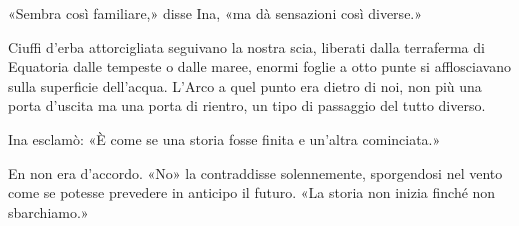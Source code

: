 «Sembra così familiare,» disse Ina, «ma dà sensazioni così diverse.»

Ciuffi d'erba attorcigliata seguivano la nostra scia, liberati dalla
terraferma di Equatoria dalle tempeste o dalle maree, enormi foglie a
otto punte si afflosciavano sulla superficie dell'acqua. L'Arco a quel
punto era dietro di noi, non più una porta d'uscita ma una porta di
rientro, un tipo di passaggio del tutto diverso.

Ina esclamò: «È come se una storia fosse finita e un'altra cominciata.»

En non era d'accordo. «No» la contraddisse solennemente, sporgendosi nel
vento come se potesse prevedere in anticipo il futuro. «La storia non
inizia finché non sbarchiamo.»
